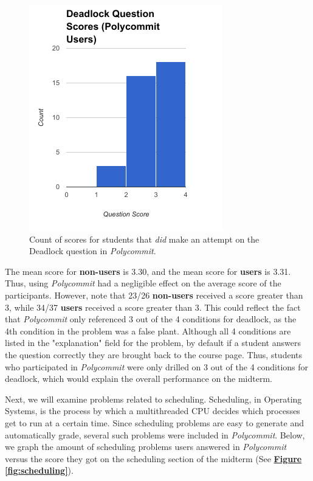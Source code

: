 \begin{figure}[h!b]
	\includegraphics[width=0.5\linewidth]{figures/deadlock-users}
	\caption{Count of scores for students that \textit{did} make an attempt on the Deadlock question in \textit{Polycommit}.}
	\label{fig:deadlock-yes}
\end{figure}

\par The mean score for \textbf{non-users} is 3.30, and the mean score for \textbf{users} is 3.31. Thus, using \textit{Polycommit} had a negligible effect on the average score of the participants. However, note that 23/26 \textbf{non-users} received a score greater than 3, while 34/37 \textbf{users} received a score greater than 3. This could reflect the fact that \textit{Polycommit} only referenced 3 out of the 4 conditions for deadlock, as the 4th condition in the problem was a false plant. Although all 4 conditions are listed in the "explanation" field for the problem, by default if a student answers the question correctly they are brought back to the course page. Thus, students who participated in \textit{Polycommit} were only drilled on 3 out of the 4 conditions for deadlock, which would explain the overall performance on the midterm.

\par Next, we will examine problems related to scheduling. Scheduling, in Operating Systems, is the process by which a multithreaded CPU decides which processes get to run at a certain time. Since scheduling problems are easy to generate and automatically grade, several such problems were included in \textit{Polycommit}. Below, we graph the amount of scheduling problems users answered in \textit{Polycommit} versus the score they got on the scheduling section of the midterm (See \textbf{\hyperref[fig:scheduling]{Figure \ref*{fig:scheduling}}}).

